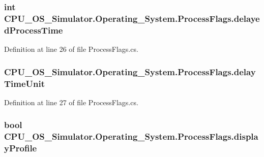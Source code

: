 \subsubsection[{delayed\+Process\+Time}]{\setlength{\rightskip}{0pt plus 5cm}int C\+P\+U\+\_\+\+O\+S\+\_\+\+Simulator.\+Operating\+\_\+\+System.\+Process\+Flags.\+delayed\+Process\+Time}\label{struct_c_p_u___o_s___simulator_1_1_operating___system_1_1_process_flags_a9b9ff1ea252f64035813f0f478d705ae}


Definition at line 26 of file Process\+Flags.\+cs.

\hypertarget{struct_c_p_u___o_s___simulator_1_1_operating___system_1_1_process_flags_a0e5e535ff000e1b630180443c2295776}{}
\subsubsection[{delay\+Time\+Unit}]{ C\+P\+U\+\_\+\+O\+S\+\_\+\+Simulator.\+Operating\+\_\+\+System.\+Process\+Flags.\+delay\+Time\+Unit}\label{struct_c_p_u___o_s___simulator_1_1_operating___system_1_1_process_flags_a0e5e535ff000e1b630180443c2295776}


Definition at line 27 of file Process\+Flags.\+cs.

\hypertarget{struct_c_p_u___o_s___simulator_1_1_operating___system_1_1_process_flags_a8290519886f3517f690f3acba8330440}{}
\subsubsection[{display\+Profile}]{\setlength{\rightskip}{0pt plus 5cm}bool C\+P\+U\+\_\+\+O\+S\+\_\+\+Simulator.\+Operating\+\_\+\+System.\+Process\+Flags.\+display\+Profile}\label{struct_c_p_u___o_s___simulator_1_1_operating___system_1_1_process_flags_a8290519886f3517f690f3acba8330440}


